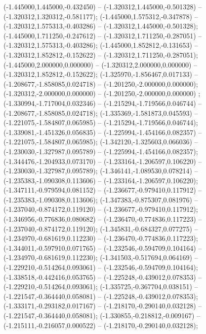  (-1.445000,1.445000,-0.432450) -- (-1.320312,1.445000,-0.501328) -- (-1.320312,1.320312,-0.581177);
 (-1.445000,1.575312,-0.347878) -- (-1.320312,1.575313,-0.403286) -- (-1.320312,1.445000,-0.501328);
 (-1.445000,1.711250,-0.247612) -- (-1.320312,1.711250,-0.287051) -- (-1.320312,1.575313,-0.403286);
 (-1.445000,1.852812,-0.131653) -- (-1.320312,1.852812,-0.152622) -- (-1.320312,1.711250,-0.287051);
 (-1.445000,2.000000,0.000000) -- (-1.320312,2.000000,0.000000) -- (-1.320312,1.852812,-0.152622);
 (-1.325970,-1.856467,0.017133) -- (-1.208677,-1.858085,0.024718) -- (-1.201250,-2.000000,0.000000);
 (-1.320312,-2.000000,0.000000) -- (-1.201250,-2.000000,0.000000) ;
 (-1.330994,-1.717004,0.032346) -- (-1.215294,-1.719566,0.046744) -- (-1.208677,-1.858085,0.024718);
 (-1.335369,-1.581873,0.045593) -- (-1.221075,-1.584807,0.065985) -- (-1.215294,-1.719566,0.046744);
 (-1.339081,-1.451326,0.056835) -- (-1.225994,-1.454166,0.082357) -- (-1.221075,-1.584807,0.065985);
 (-1.342120,-1.325603,0.066036) -- (-1.230030,-1.327987,0.095789) -- (-1.225994,-1.454166,0.082357);
 (-1.344476,-1.204933,0.073170) -- (-1.233164,-1.206597,0.106220) -- (-1.230030,-1.327987,0.095789);
 (-1.346141,-1.089530,0.078214) -- (-1.235383,-1.090308,0.113606) -- (-1.233164,-1.206597,0.106220);
 (-1.347111,-0.979594,0.081152) -- (-1.236677,-0.979410,0.117912) -- (-1.235383,-1.090308,0.113606);
 (-1.347383,-0.875307,0.081976) -- (-1.237040,-0.874172,0.119120) -- (-1.236677,-0.979410,0.117912);
 (-1.346956,-0.776836,0.080682) -- (-1.236470,-0.774836,0.117223) -- (-1.237040,-0.874172,0.119120);
 (-1.345831,-0.684327,0.077275) -- (-1.234970,-0.681619,0.112230) -- (-1.236470,-0.774836,0.117223);
 (-1.344011,-0.597910,0.071765) -- (-1.232546,-0.594709,0.104164) -- (-1.234970,-0.681619,0.112230);
 (-1.341503,-0.517694,0.064169) -- (-1.229210,-0.514264,0.093061) -- (-1.232546,-0.594709,0.104164);
 (-1.338518,-0.442416,0.053765) -- (-1.225248,-0.439012,0.078353) -- (-1.229210,-0.514264,0.093061);
 (-1.335725,-0.367704,0.038151) -- (-1.221547,-0.364440,0.058081) -- (-1.225248,-0.439012,0.078353);
 (-1.333171,-0.293182,0.017167) -- (-1.218170,-0.290140,0.032128) -- (-1.221547,-0.364440,0.058081);
 (-1.330855,-0.218812,-0.009167) -- (-1.215111,-0.216057,0.000522) -- (-1.218170,-0.290140,0.032128);
